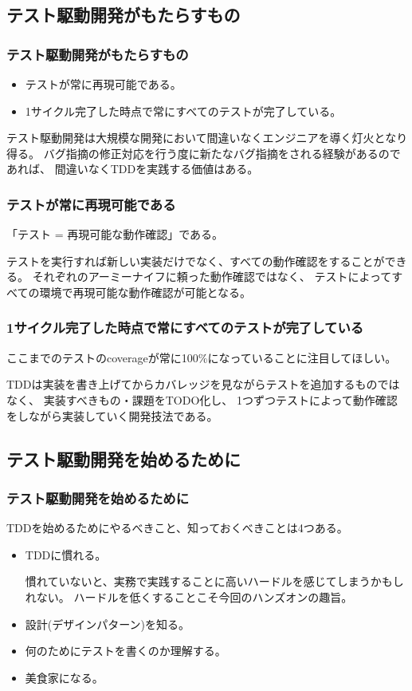 \documentclass[aspectratio=169]{beamer}
\begin{document}
\subsection{テスト駆動開発がもたらすもの}
\begin{frame}\frametitle{テスト駆動開発がもたらすもの}
  \begin{itemize}
    \item {\color{blue} テストが常に再現可能である。}
    \item {\color{blue} 1サイクル完了した時点で常にすべてのテストが完了している。}
  \end{itemize}

  テスト駆動開発は大規模な開発において間違いなくエンジニアを導く灯火となり得る。
  \color{gray} 
  バグ指摘の修正対応を行う度に新たなバグ指摘をされる経験があるのであれば、
  間違いなくTDDを実践する価値はある。
\end{frame}

\begin{frame}\frametitle{テストが常に再現可能である}
  {\color{blue}「テスト = 再現可能な動作確認」}である。

  テストを実行すれば新しい実装だけでなく、すべての動作確認をすることができる。
  それぞれのアーミーナイフに頼った動作確認ではなく、
  {\color{blue} テストによってすべての環境で再現可能な動作確認が可能となる。}
\end{frame}

\begin{frame}\frametitle{1サイクル完了した時点で常にすべてのテストが完了している}
  ここまでのテストのcoverageが常に100\%になっていることに注目してほしい。

  TDDは実装を書き上げてからカバレッジを見ながらテストを追加するものではなく、
  \color{blue}
  実装すべきもの・課題をTODO化し、
  1つずつテストによって動作確認をしながら実装していく開発技法である。
\end{frame}

\subsection{テスト駆動開発を始めるために}
\begin{frame}\frametitle{テスト駆動開発を始めるために}
  TDDを始めるためにやるべきこと、知っておくべきことは4つある。
  \begin{itemize}
    \item {\color{blue} TDDに慣れる。}

      慣れていないと、実務で実践することに高いハードルを感じてしまうかもしれない。
      ハードルを低くすることこそ今回のハンズオンの趣旨。
    \item {\color{blue} 設計(デザインパターン)を知る。}
    \item {\color{blue} 何のためにテストを書くのか理解する。}
    \item {\color{blue} 美食家になる。}
  \end{itemize}
\end{frame}
\end{document}
